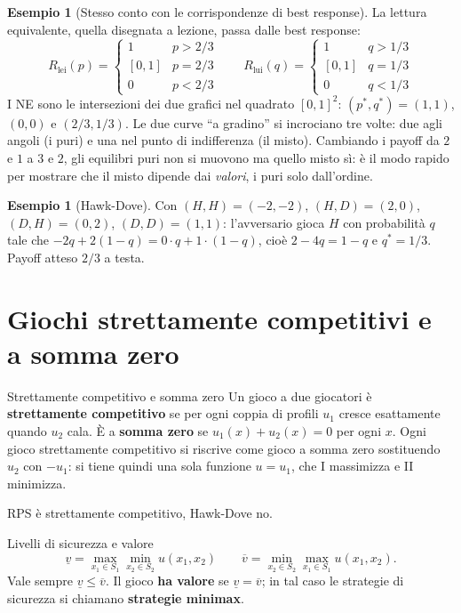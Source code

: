 \documentclass[12pt,a4paper,twoside]{book}
\theoremstyle{plain}
\theoremstyle{definition}
\newtheorem{example}[theorem]{Esempio}
\begin{document}
\begin{example}[Stesso conto con le corrispondenze di best response]
La lettura equivalente, quella disegnata a lezione, passa dalle best response:
\[
  R_{\text{lei}}(p)=\begin{cases}1 & p>2/3\\ [0,1] & p=2/3\\ 0 & p<2/3\end{cases}
  \qquad
  R_{\text{lui}}(q)=\begin{cases}1 & q>1/3\\ [0,1] & q=1/3\\ 0 & q<1/3\end{cases}
\]
I NE sono le intersezioni dei due grafici nel quadrato $[0,1]^2$:
$(p^*,q^*)=(1,1)$, $(0,0)$ e $(2/3,1/3)$. Le due curve ``a gradino'' si incrociano
tre volte: due agli angoli (i puri) e una nel punto di indifferenza (il misto).
Cambiando i payoff da $2$ e $1$ a $3$ e $2$, gli equilibri puri non si muovono ma
quello misto sì: è il modo rapido per mostrare che il misto dipende dai
\emph{valori}, i puri solo dall'ordine.
\end{example}

\begin{example}[Hawk-Dove]
Con $(H,H)=(-2,-2)$, $(H,D)=(2,0)$, $(D,H)=(0,2)$, $(D,D)=(1,1)$: l'avversario
gioca $H$ con probabilità $q$ tale che $-2q+2(1-q)=0\cdot q+1\cdot(1-q)$, cioè
$2-4q=1-q$ e $q^*=1/3$. Payoff atteso $2/3$ a testa.
\end{example}

\section{Giochi strettamente competitivi e a somma zero}

\begin{defbox}{Strettamente competitivo e somma zero}
Un gioco a due giocatori è \textbf{strettamente competitivo} se per ogni coppia di
profili $u_1$ cresce esattamente quando $u_2$ cala. È a \textbf{somma zero} se
$u_1(x)+u_2(x)=0$ per ogni $x$. Ogni gioco strettamente competitivo si riscrive
come gioco a somma zero sostituendo $u_2$ con $-u_1$: si tiene quindi una sola
funzione $u=u_1$, che I massimizza e II minimizza.
\end{defbox}

RPS è strettamente competitivo, Hawk-Dove no.

\begin{defbox}{Livelli di sicurezza e valore}
\[
  \underline{v}=\max_{x_1\in S_1}\min_{x_2\in S_2} u(x_1,x_2)
  \qquad
  \overline{v}=\min_{x_2\in S_2}\max_{x_1\in S_1} u(x_1,x_2).
\]
Vale sempre $\underline{v}\le\overline{v}$. Il gioco \textbf{ha valore} se
$\underline{v}=\overline{v}$; in tal caso le strategie di sicurezza si chiamano
\textbf{strategie minimax}.
\end{defbox}
\end{document}
